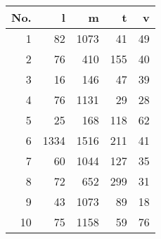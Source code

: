 \begin{tabular}{rrrrr}\toprule 
No.&l&m&t&v\\
\midrule
1&82&1073&41&49\\
2&76&410&155&40\\
3&16&146&47&39\\
4&76&1131&29&28\\
5&25&168&118&62\\
6&1334&1516&211&41\\
7&60&1044&127&35\\
8&72&652&299&31\\
9&43&1073&89&18\\
10&75&1158&59&76\\
\bottomrule
\end{tabular}
